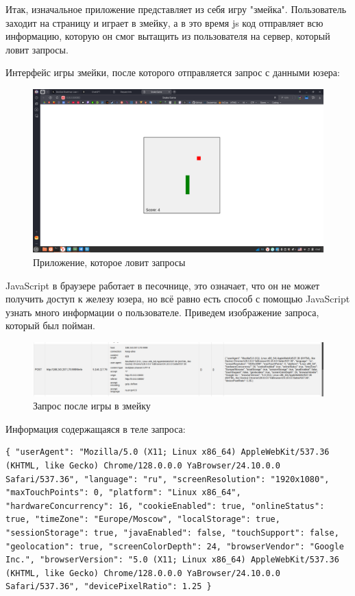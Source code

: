 \documentclass[a4paper, 12pt]{article}
\begin{document}
Итак, изначальное приложение представляет из себя игру "змейка". Пользователь заходит на страницу и играет в змейку, а в это время js код отправляет всю информацию, которую он смог вытащить из пользователя на сервер, который ловит запросы.

Интерфейс игры змейки, после которого отправляется запрос с данными юзера:

\newpage
\begin{figure}[h!]
    \noindent
    \centering
    \includegraphics[width=1\linewidth]{pic_serpant.png}
    \caption{Приложение, которое ловит запросы}
\end{figure}

JavaScript в браузере работает в песочнице, это означает, что он не может получить доступ к железу юзера, но всё равно есть способ с помощью JavaScript узнать много информации о пользователе. Приведем изображение запроса, который был пойман.

\begin{figure}[h!]
    \noindent
    \centering
    \includegraphics[width=1\linewidth]{pic_request_1_pc.png}
    \caption{Запрос после игры в змейку}
\end{figure}

Информация содержащаяся в теле запроса:
\begin{lstlisting}
{ "userAgent": "Mozilla/5.0 (X11; Linux x86_64) AppleWebKit/537.36 (KHTML, like Gecko) Chrome/128.0.0.0 YaBrowser/24.10.0.0 Safari/537.36", "language": "ru", "screenResolution": "1920x1080", "maxTouchPoints": 0, "platform": "Linux x86_64", "hardwareConcurrency": 16, "cookieEnabled": true, "onlineStatus": true, "timeZone": "Europe/Moscow", "localStorage": true, "sessionStorage": true, "javaEnabled": false, "touchSupport": false, "geolocation": true, "screenColorDepth": 24, "browserVendor": "Google Inc.", "browserVersion": "5.0 (X11; Linux x86_64) AppleWebKit/537.36 (KHTML, like Gecko) Chrome/128.0.0.0 YaBrowser/24.10.0.0 Safari/537.36", "devicePixelRatio": 1.25 }
\end{lstlisting}
\end{document}
